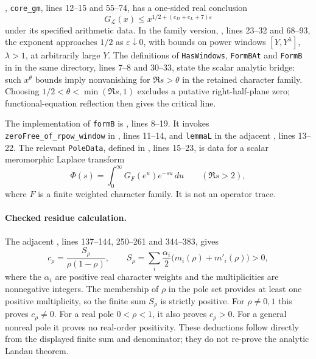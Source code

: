 \documentclass[11pt,a4paper]{article}
\begin{document}
, \texttt{core\_gm}, lines 12--15 and 55--74, has a one-sided real conclusion
\[
 G_{\mathcal L}(x)\le x^{1/2+(e_D+e_L+7)\varepsilon}
\]
under its specified arithmetic data. In the family version, , lines 23--32 and 68--93, the exponent approaches $1/2$ as $\varepsilon\downarrow0$, with bounds on power windows $[Y,Y^\lambda]$, $\lambda>1$, at arbitrarily large $Y$. The definitions of \texttt{HasWindows}, \texttt{FormBAt} and \texttt{FormB} in  in the same directory, lines 7--8 and 30--33, state the scalar analytic bridge: such $x^\theta$ bounds imply nonvanishing for $\Re s>\theta$ in the retained character family. Choosing $1/2<\theta<\min(\Re s,1)$ excludes a putative right-half-plane zero; functional-equation reflection then gives the critical line.

The implementation of \texttt{formB} is , lines 8--19. It invokes \texttt{zeroFree\_of\_rpow\_window} in , lines 11--14, and \texttt{lemmaL} in the adjacent , lines 13--22. The relevant \texttt{PoleData}, defined in , lines 15--23, is data for a scalar meromorphic Laplace transform
\[
 \Phi(s)=\int_0^\infty G_F(e^u)e^{-su}\,du\qquad(\Re s>2),
\]
where $F$ is a finite weighted character family. It is not an operator trace.

\paragraph{Checked residue calculation.}
The adjacent , lines 137--144, 250--261 and 344--383, gives
\[
 c_\rho=\frac{S_\rho}{\rho(1-\rho)},\qquad
 S_\rho=\sum_i\frac{\alpha_i}{2}\bigl(m_i(\rho)+m'_i(\rho)\bigr)>0,
\]
where the $\alpha_i$ are positive real character weights and the multiplicities are nonnegative integers. The membership of $\rho$ in the pole set provides at least one positive multiplicity, so the finite sum $S_\rho$ is strictly positive. For $\rho\ne0,1$ this proves $c_\rho\ne0$. For a real pole $0<\rho<1$, it also proves $c_\rho>0$. For a general nonreal pole it proves no real-order positivity. These deductions follow directly from the displayed finite sum and denominator; they do not re-prove the analytic Landau theorem.
\end{document}
